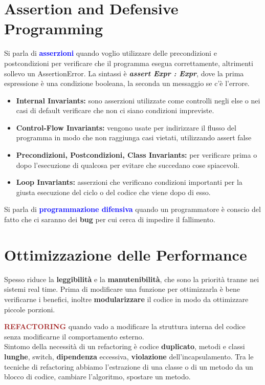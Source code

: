 \section{Assertion and Defensive Programming}
\begin{boxDef}
Si parla di \textbf{\textcolor{blue}{asserzioni}} quando voglio utilizzare delle precondizioni e postcondizioni per verificare che il programma esegua correttamente, altrimenti sollevo un AssertionError. La sintassi è \textbf{\textit{assert Expr : Expr}}, dove la prima espressione è una condizione booleana, la seconda un messaggio se c'è l'errore. 
\begin{itemize}
    \item \textbf{Internal Invariants:} sono asserzioni utilizzate come controlli negli else o nei casi di default verificare che non ci siano condizioni impreviste.
    \item \textbf{Control-Flow Invariants:} vengono usate per indirizzare il flusso del programma in modo che non raggiunga casi vietati, utilizzando assert false
    \item \textbf{Precondizioni, Postcondizioni, Class Invariants:} per verificare prima o dopo l'esecuzione di qualcosa per evitare che succedano cose spiacevoli.
    \item \textbf{Loop Invariants:} asserzioni che verificano condizioni importanti per la giusta esecuzione del ciclo o del codice che viene dopo di esso.
\end{itemize}
Si parla di \textbf{\textcolor{blue}{programmazione difensiva}} quando un programmatore è conscio del fatto che ci saranno dei \textbf{bug} per cui cerca di impedire il fallimento.
\end{boxDef}

\section{Ottimizzazione delle Performance}
Spesso riduce la \textbf{leggibilità} e la \textbf{manutenibilità}, che sono la priorità tranne nei sistemi real time.
Prima di modificare una funzione per ottimizzarla è bene verificarne i benefici, inoltre \textbf{modularizzare} il codice in modo da ottimizzare piccole porzioni.

\begin{boxDef}
\textbf{\textcolor{brown}{REFACTORING}} quando vado a modificare la struttura interna del codice senza modificarne il comportamento esterno. \\
Sintomo della necessità di un refactoring è codice \textbf{duplicato}, metodi e classi \textbf{lunghe}, switch, \textbf{dipendenza} eccessiva, \textbf{violazione} dell'incapsulamento.
Tra le tecniche di refactoring abbiamo l'estrazione di una classe o di un metodo da un blocco di codice, cambiare l'algoritmo, spostare un metodo.
\end{boxDef}

